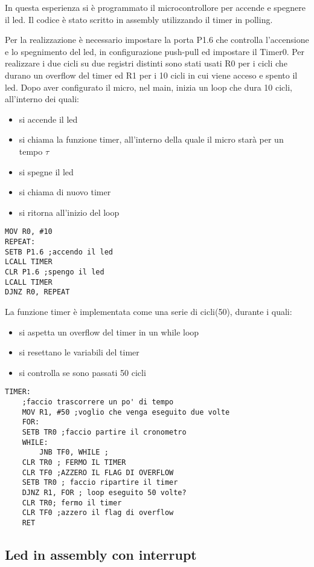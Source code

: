 \documentclass[main.tex]{subfiles}
\begin{document}
In questa esperienza si è programmato il microcontrollore per accende e spegnere il led. Il codice è stato scritto in assembly utilizzando il timer in polling.

Per la realizzazione è necessario impostare la porta P1.6 che controlla l’accensione e lo spegnimento del led, in configurazione push-pull ed impostare il Timer0.
Per realizzare i due cicli su due registri distinti sono stati usati R0 per i cicli che durano un overflow del timer ed R1 per i 10 cicli in cui viene acceso e spento il led. 
Dopo aver configurato il micro, nel main, inizia un loop che dura 10 cicli, all'interno dei quali:
\begin{itemize}
    \item si accende il led
    \item si chiama la funzione timer, all'interno della quale il micro starà per un tempo $\tau$
    \item si spegne il led
    \item si chiama di nuovo timer
    \item si ritorna all'inizio del loop
\end{itemize}
\begin{lstlisting}[caption=Main del programma]
MOV R0, #10
REPEAT:
SETB P1.6 ;accendo il led
LCALL TIMER
CLR P1.6 ;spengo il led
LCALL TIMER
DJNZ R0, REPEAT
\end{lstlisting}
La funzione timer è implementata come una serie di cicli(50), durante i quali:
\begin{itemize}
    \item si aspetta un overflow del timer in un while loop
    \item si resettano le variabili del timer
    \item si controlla se sono passati 50 cicli
\end{itemize}
\begin{lstlisting}[caption=Funzione timer]
TIMER:
	;faccio trascorrere un po' di tempo
	MOV R1, #50 ;voglio che venga eseguito due volte
	FOR:
	SETB TR0 ;faccio partire il cronometro
	WHILE:
		JNB TF0, WHILE ;
	CLR TR0 ; FERMO IL TIMER
	CLR TF0 ;AZZERO IL FLAG DI OVERFLOW
	SETB TR0 ; faccio ripartire il timer
	DJNZ R1, FOR ; loop eseguito 50 volte?
	CLR TR0; fermo il timer
	CLR TF0 ;azzero il flag di overflow
	RET
\end{lstlisting}


\subsection{Led in assembly con interrupt}
\end{document}
